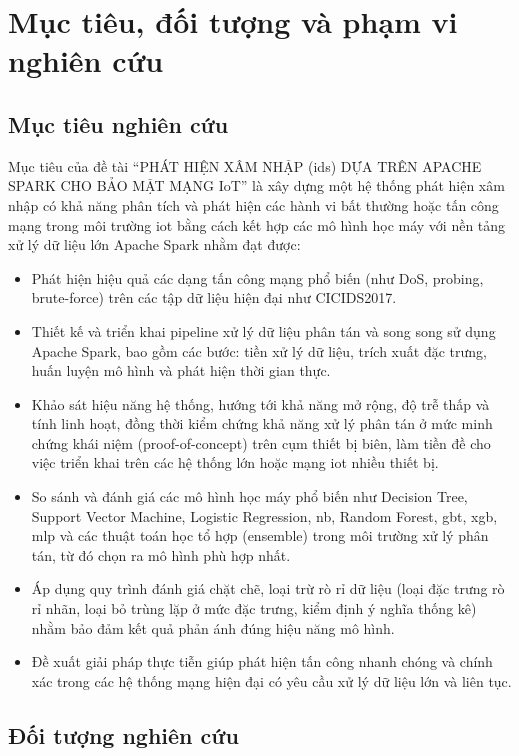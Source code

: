 \section{Mục tiêu, đối tượng và phạm vi nghiên cứu}
\subsection{Mục tiêu nghiên cứu}
\label{sec:MucTieu}
Mục tiêu của đề tài ``PHÁT HIỆN XÂM NHẬP (\ac{ids}) DỰA TRÊN APACHE SPARK CHO BẢO MẬT MẠNG IoT'' là xây dựng một hệ thống phát hiện xâm nhập có khả năng phân tích và phát hiện các hành vi bất thường hoặc tấn công mạng trong môi trường \ac{iot} bằng cách kết hợp các mô hình học máy với nền tảng xử lý dữ liệu lớn Apache Spark nhằm đạt được:
\begin{itemize}
  \item Phát hiện hiệu quả các dạng tấn công mạng phổ biến (như DoS, probing, brute-force) trên các tập dữ liệu hiện đại như CICIDS2017.
  \item Thiết kế và triển khai pipeline xử lý dữ liệu phân tán và song song sử dụng Apache Spark, bao gồm các bước: tiền xử lý dữ liệu, trích xuất đặc trưng, huấn luyện mô hình và phát hiện thời gian thực.
  \item Khảo sát hiệu năng hệ thống, hướng tới khả năng mở rộng, độ trễ thấp và tính linh hoạt, đồng thời kiểm chứng khả năng xử lý phân tán ở mức minh chứng khái niệm (proof-of-concept) trên cụm thiết bị biên, làm tiền đề cho việc triển khai trên các hệ thống lớn hoặc mạng \ac{iot} nhiều thiết bị.
  \item So sánh và đánh giá các mô hình học máy phổ biến như Decision Tree, Support Vector Machine, Logistic Regression, \ac{nb}, Random Forest, \ac{gbt}, \ac{xgb}, \ac{mlp} và các thuật toán học tổ hợp (ensemble) trong môi trường xử lý phân tán, từ đó chọn ra mô hình phù hợp nhất.
  \item Áp dụng quy trình đánh giá chặt chẽ, loại trừ rò rỉ dữ liệu (loại đặc trưng rò rỉ nhãn, loại bỏ trùng lặp ở mức đặc trưng, kiểm định ý nghĩa thống kê) nhằm bảo đảm kết quả phản ánh đúng hiệu năng mô hình.
\item Đề xuất giải pháp thực tiễn giúp phát hiện tấn công nhanh chóng và chính xác trong các hệ thống mạng hiện đại có yêu cầu xử lý dữ liệu lớn và liên tục.
\end{itemize}

\subsection{Đối tượng nghiên cứu}
\label{sec:DoiTuong}

